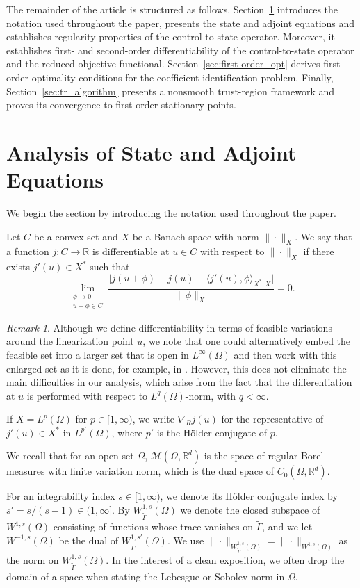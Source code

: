 \documentclass[11pt]{article}
\newcommand{\R}{\mathbb{R}}
\newcommand{\calM}{\mathcal{M}}
\theoremstyle{definition}
\theoremstyle{remark}
\newtheorem{remark}[theorem]{Remark}
\begin{document}
The remainder of the article is structured as follows.
Section~\ref{Section2} introduces the notation used throughout the paper,
presents the state and adjoint equations and establishes regularity properties of the control-to-state operator. Moreover, it  establishes first- and second-order differentiability of the control-to-state operator and the reduced objective functional.
Section~\ref{sec:first-order_opt} derives first-order optimality conditions for the coefficient identification problem.
Finally, Section~\ref{sec:tr_algorithm} presents a nonsmooth trust-region framework and proves its convergence to first-order stationary points.


\section{Analysis of State and Adjoint Equations} \label{Section2}
%
We begin the section by introducing the notation used throughout 
the paper.

Let $C$ be a convex set and $X$ be a Banach space with norm $\|\cdot\|_X$.
We say that a function $j : C \to \R$ is differentiable at $u \in C$ with respect to $\|\cdot\|_X$
if there exists $j'(u) \in X^*$ such that
%
\[
\underset{\substack{\phi \to 0 \\ u + \phi \in C}}
\lim \frac{\big|j(u + \phi) - j(u) - \langle j'(u), \phi\rangle_{X^*,X}\big|}{\|\phi\|_{X}} = 0.
\]
%
\begin{remark}
Although we define differentiability in terms of feasible variations around the linearization point $u$, we note that one could alternatively embed the feasible set into a larger set that is open in $L^\infty(\Omega)$
and then work with this enlarged set as it is done, for example, in \cite{clason2018total}. However, this does not eliminate the main difficulties in our analysis, which arise from the fact that the differentiation at $u$ is performed with respect to $L^q(\Omega)$-norm, with $q < \infty$.
\end{remark}

If $X = L^p(\Omega)$ for $p \in [1,\infty)$, we write
$\nabla_R j(u)$ for the representative of $j'(u) \in X^*$ in $L^{p'}(\Omega)$, where $p'$ is the Hölder conjugate of $p$.



We recall that for an open set $\Omega$, $\calM(\Omega,\R^d)$ is
the space of regular Borel measures with finite variation
norm, which is the dual space of $C_0(\Omega,\R^d)$.


For an integrability index $s \in [1,\infty)$, we denote its Hölder conjugate index by
$s' = s/(s-1) \in (1,\infty]$.
By $W^{1,s}_{\tilde\Gamma}(\Omega)$ we denote the closed subspace of 
$W^{1,s}(\Omega)$ consisting of functions whose trace vanishes on $\tilde\Gamma$, and we let 
 $W^{-1,s}(\Omega)$ be the dual of $W^{1,s'}_{\tilde\Gamma}(\Omega)$.
We use $\|\cdot\|_{W^{1,s}_{\tilde\Gamma}(\Omega)} = \|\cdot\|_{W^{1,s}(\Omega)}$ as the norm on $W^{1,s}_{\tilde\Gamma}(\Omega)$.
In the interest of a clean exposition, we often drop the domain of a space
when stating the Lebesgue or Sobolev norm in $\Omega$.
\end{document}
